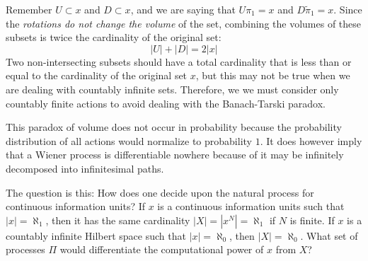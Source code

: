 \documentclass[10pt, a5paper, twoside, openright]{memoir}
\begin{document}
Remember $U \subset x$ and $D \subset x$, and we are saying that $U \pi_1 = x$ and $D \tilde \pi_1 = x$. Since the \textit{rotations do not change the volume} of the set, combining the volumes of these subsets is twice the cardinality of the original set:
$$|U| + |D| = 2|x|$$
Two non-intersecting subsets should have a total cardinality that is less than or equal to the cardinality of the original set $x$, but this may not be true when we are dealing with countably infinite sets. Therefore, we we must consider only countably finite actions to avoid dealing with the Banach-Tarski paradox.

This paradox of volume does not occur in probability because the probability distribution of all actions would normalize to probability $1$. It does however imply that a Wiener process is differentiable nowhere because of it may be infinitely decomposed into infinitesimal paths.

The question is this: How does one decide upon the natural process for continuous information units? If $x$ is a continuous information units such that $|x| = \aleph_1$, then it has the same cardinality $|X| = |x^N| = \aleph_1$ if $N$ is finite. If $x$ is a countably infinite Hilbert space such that $|x| = \aleph_0$, then $|X| = \aleph_0$. What set of processes $\Pi$ would differentiate the computational power of $x$ from $X$?
\end{document}
